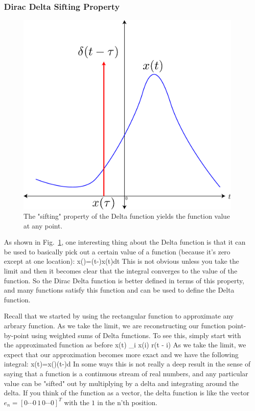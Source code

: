 \subsubsection{Dirac Delta Sifting Property}




\begin{figure}[tb]
\begin{center}
\includegraphics[width=.5\columnwidth]{delta_sift}
\end{center}
\caption{The "sifting" property of the Delta function yields the function value at any point. } \label{fig:delta_sift}
\end{figure}



As shown in Fig.~\ref{fig:delta_sift}, one interesting thing about the Delta function is that it can be used to basically pick out a certain value of a function (because it's zero except at one location):
\be
	x\left(\tau\right)=\int\delta\left(t-\tau\right)x\left(t\right)dt
\ee
This is not obvious unless you take the limit and then it becomes clear that the integral converges to the value of the function.  So the Dirac Delta function is better defined in terms of this property, and many functions satisfy this function and can be used to define the Delta function.

Recall that we started by using the rectangular function to approximate any arbrary function.  As we take the limit, we are reconstructing our function point-by-point using weighted sums of Delta functions.  To see this, simply start with the approximated  function as before
\be
	x(t) \approx \sum_i x(i\tau) r(t - i\tau) \Delta
\ee
As we take the limit, we expect that our approximation becomes more exact and we have the following integral:
\be
	x\left(t\right)=\int x\left(\tau\right)\delta\left(t-\tau\right)d\tau
\ee
In some ways this is not really a deep result in the sense of  saying that a function is a continuous stream of real numbers, and any particular value can be "sifted" out by multiplying by a delta and integrating around the delta.  If you think of the function as a vector, the delta function is like the vector $e_n = [0 \cdots 0\, 1\, 0 \cdots 0 ]^T$ with the $1$ in the n'th position. 


